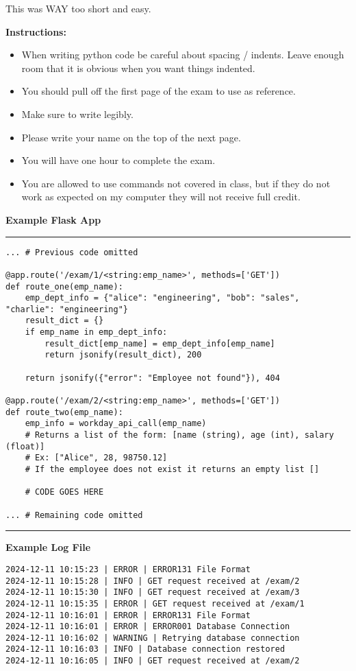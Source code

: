 \documentclass[11pt]{article}
\begin{document}
This was WAY too short and easy.

\noindent \textbf{Instructions:} \begin{itemize}
\item When writing python code be careful about spacing / indents. Leave enough room that it is obvious when you want things indented. 
\item You should pull off the first page of the exam to use as reference.
\item Make sure to write legibly.
\item Please write your name on the top of the next page.
\item You will have one hour to complete the exam.
\item You are allowed to use commands not covered in class, but if they do not work as expected on my computer they will not receive full credit.
\end{itemize}

{\bf Example Flask App }
\\
{\color{lightgray}\hrule}

\begin{verbatim}
... # Previous code omitted

@app.route('/exam/1/<string:emp_name>', methods=['GET'])
def route_one(emp_name):
    emp_dept_info = {"alice": "engineering", "bob": "sales", "charlie": "engineering"}
    result_dict = {}
    if emp_name in emp_dept_info:
        result_dict[emp_name] = emp_dept_info[emp_name]
        return jsonify(result_dict), 200
    
    return jsonify({"error": "Employee not found"}), 404

@app.route('/exam/2/<string:emp_name>', methods=['GET'])
def route_two(emp_name):
    emp_info = workday_api_call(emp_name)
    # Returns a list of the form: [name (string), age (int), salary (float)]
    # Ex: ["Alice", 28, 98750.12] 
    # If the employee does not exist it returns an empty list []
    
    # CODE GOES HERE

... # Remaining code omitted
\end{verbatim}
{\color{lightgray}\hrule}

\vspace{.5cm}

{\bf Example Log File}

\begin{verbatim}
2024-12-11 10:15:23 | ERROR | ERROR131 File Format
2024-12-11 10:15:28 | INFO | GET request received at /exam/2
2024-12-11 10:15:30 | INFO | GET request received at /exam/3
2024-12-11 10:15:35 | ERROR | GET request received at /exam/1
2024-12-11 10:16:01 | ERROR | ERROR131 File Format
2024-12-11 10:16:01 | ERROR | ERROR001 Database Connection
2024-12-11 10:16:02 | WARNING | Retrying database connection
2024-12-11 10:16:03 | INFO | Database connection restored
2024-12-11 10:16:05 | INFO | GET request received at /exam/2	
\end{verbatim}
\end{document}
